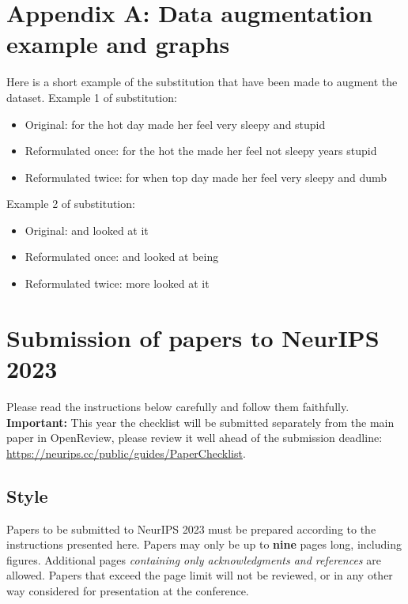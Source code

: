 \documentclass{article}
\begin{document}
\newpage


\section{Appendix A: Data augmentation example and graphs}

Here is a short example of the substitution that have been made to augment the dataset.
Example 1 of substitution:
\begin{itemize}
    \item Original: for the hot day made her feel very sleepy and stupid
    \item Reformulated once: for the hot the made her feel not sleepy years stupid
    \item Reformulated twice: for when top day made her feel very sleepy and dumb
\end{itemize}
Example 2 of substitution:
\begin{itemize}
    \item Original: and looked at it 
    \item Reformulated once: and looked at being 
    \item Reformulated twice: more looked at it 
\end{itemize}

\newpage


\section{Submission of papers to NeurIPS 2023}

Please read the instructions below carefully and follow them faithfully. \textbf{Important:} This year the checklist will be submitted separately from the main paper in OpenReview, please review it well ahead of the submission deadline: \url{https://neurips.cc/public/guides/PaperChecklist}.


\subsection{Style}


Papers to be submitted to NeurIPS 2023 must be prepared according to the
instructions presented here. Papers may only be up to {\bf nine} pages long,
including figures. Additional pages \emph{containing only acknowledgments and
references} are allowed. Papers that exceed the page limit will not be
reviewed, or in any other way considered for presentation at the conference.
\end{document}
